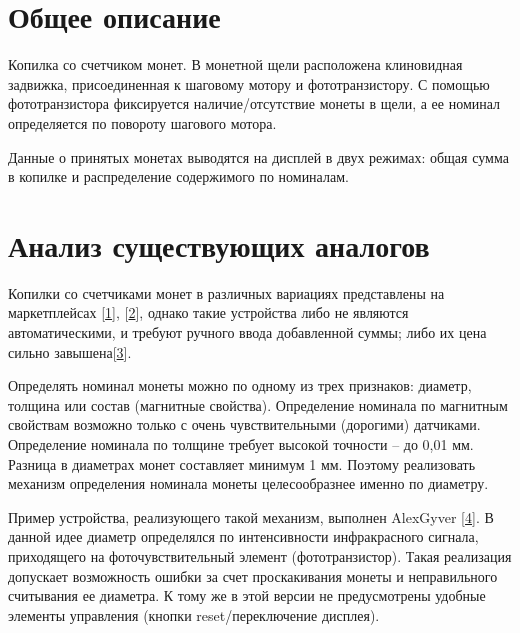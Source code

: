 \section {Общее описание}

Копилка со счетчиком монет. В монетной щели расположена клиновидная задвижка, присоединенная к шаговому мотору и фототранзистору. С помощью фототранзистора фиксируется наличие/отсутствие монеты в щели, а ее номинал определяется по повороту шагового мотора.
\par\medskip

Данные о принятых монетах выводятся на дисплей в двух режимах: общая сумма в копилке и распределение содержимого по номиналам.

\section {Анализ существующих аналогов}

Копилки со счетчиками монет в различных вариациях представлены на маркетплейсах [\href{https://www.ozon.ru/product/yilijukj-kopilka-dlya-deneg-11h20-sm-1358489566/?asb=sCr1GmIlWB7Fjby%252BPYnWUNFeAjvdIw5ordlD0iRvbOM%253D&asb2=sn4m9gpYWZy_EEZH7OfMzDGoCOjFWmDehfvE83sshNuqVbbHLKnkaqdBme_UnwQL9zPGT5WB-Cli3HsA9FpOcg&avtc=1&avte=2&avts=1717862839&keywords=копилка+счетчик}{1}], [\href{https://aliexpress.ru/item/1005002928697666.html?sku_id=12000028995331515&spm=a2g2w.productlist.search_results.1.5d644f98Nvin2D}{2}], однако такие устройства либо не являются автоматическими, и требуют ручного ввода добавленной суммы; либо их цена сильно завышена[\href{https://www.ozon.ru/product/schetchik-i-sortirovshchik-monet-cassida-coinmax-1324388430/?asb=FCEZ8bYDzfLDlR1hbPXsPN7zg5D8DCyINZKx%252ByUJkgQ%253D&asb2=pFy0DP03AN1Um2JNqhlwAfVK8Tqf4HIHittgnkgxfxYFRn3HUd_mHS4O0_9rIrPfWd8S0KDwvHJyzVXS0PcbQw&avtc=1&avte=2&avts=1718018978&keywords=cassida+%D0%BC%D0%BE%D0%BD%D0%B5%D1%82%D1%8B}{3}].
\par\medskip

Определять номинал монеты можно по одному из трех признаков: диаметр, толщина или состав (магнитные свойства). Определение номинала по магнитным свойствам возможно только с очень чувствительными (дорогими) датчиками. Определение номинала по толщине требует высокой точности -- до 0,01 мм. Разница в диаметрах монет составляет минимум 1 мм. Поэтому реализовать механизм определения номинала монеты целесообразнее именно по диаметру.
\par\medskip

Пример устройства, реализующего такой механизм, выполнен AlexGyver [\href{https://www.youtube.com/watch?v=lH4qfGlK2Qk}{4}]. В данной идее диаметр определялся по интенсивности инфракрасного сигнала, приходящего на фоточувствительный элемент (фототранзистор).  Такая реализация допускает возможность ошибки за счет проскакивания монеты и неправильного считывания ее диаметра. К тому же в этой версии не предусмотрены удобные элементы управления (кнопки reset/переключение дисплея).
\par\medskip


